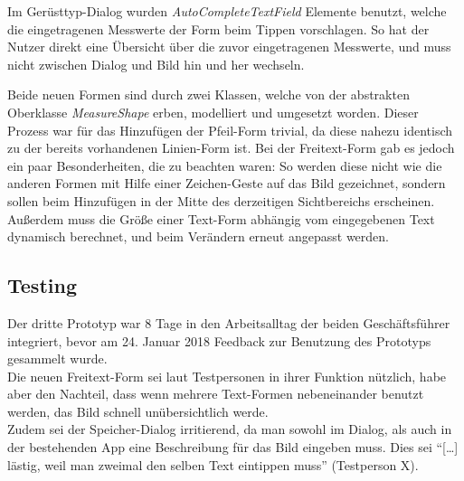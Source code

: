 Im Gerüsttyp-Dialog wurden \emph{AutoCompleteTextField} Elemente benutzt, welche die eingetragenen Messwerte der Form beim Tippen vorschlagen.
So hat der Nutzer direkt eine Übersicht über die zuvor eingetragenen Messwerte, und muss nicht zwischen Dialog und Bild hin und her wechseln. \\

Beide neuen Formen sind durch zwei Klassen, welche von der abstrakten Oberklasse \emph{MeasureShape} erben, modelliert und umgesetzt worden.
Dieser Prozess war für das Hinzufügen der Pfeil-Form trivial, da diese nahezu identisch zu der bereits vorhandenen Linien-Form ist.
Bei der Freitext-Form gab es jedoch ein paar Besonderheiten, die zu beachten waren:
So werden diese nicht wie die anderen Formen mit Hilfe einer Zeichen-Geste auf das Bild gezeichnet, sondern sollen beim Hinzufügen in der Mitte des derzeitigen Sichtbereichs erscheinen.
Außerdem muss die Größe einer Text-Form abhängig vom eingegebenen Text dynamisch berechnet, und beim Verändern erneut angepasst werden. \\

\subsection{Testing}\label{subsec:test3}
Der dritte Prototyp war 8 Tage in den Arbeitsalltag der beiden Geschäftsführer integriert, bevor am 24. Januar 2018 Feedback zur Benutzung des Prototyps gesammelt wurde. \\

Die neuen Freitext-Form sei laut Testpersonen in ihrer Funktion nützlich, habe aber den Nachteil, dass wenn mehrere Text-Formen nebeneinander benutzt werden, das Bild schnell unübersichtlich werde. \\

Zudem sei der Speicher-Dialog irritierend, da man sowohl im Dialog, als auch in der bestehenden App eine Beschreibung für das Bild eingeben muss.
Dies sei ``[\dots] lästig, weil man zweimal den selben Text eintippen muss'' (Testperson X).


